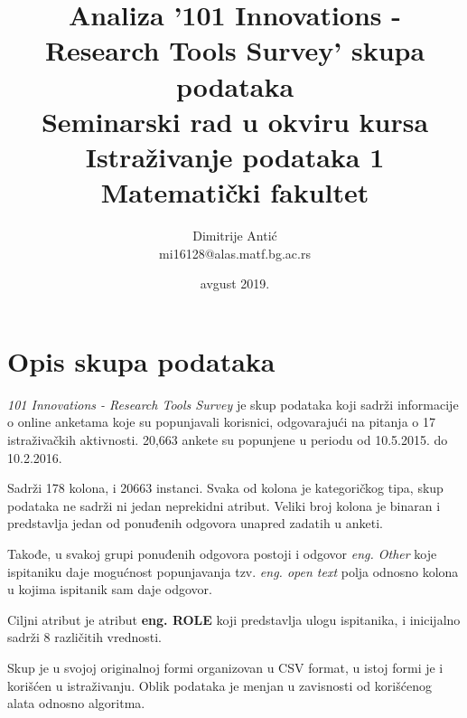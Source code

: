 \documentclass[12pt]{article}
\begin{document}
\title{Analiza '101 Innovations - Research Tools Survey' skupa podataka\\ \small{Seminarski rad u okviru kursa\\Istraživanje podataka 1\\ Matematički fakultet}}

\author{Dimitrije Antić\\ mi16128@alas.matf.bg.ac.rs}

\date{avgust 2019.}

\maketitle


\tableofcontents

\newpage

\section{Opis skupa podataka}
\label{sec:opis skupa podataka}

\textit{101 Innovations - Research Tools Survey} je skup podataka koji sadrži informacije o online anketama koje su popunjavali korisnici, odgovarajući na pitanja o 17 istraživačkih aktivnosti. 20,663 ankete su popunjene u periodu od 10.5.2015. do 10.2.2016.

Sadrži 178 kolona, i 20663 instanci. Svaka od kolona je kategoričkog tipa, skup podataka ne sadrži ni jedan neprekidni atribut. Veliki broj kolona je binaran i predstavlja jedan od ponuđenih odgovora unapred zadatih u anketi. 

Takođe, u svakoj grupi ponuđenih odgovora postoji i odgovor \textit{eng. Other} koje ispitaniku daje mogućnost popunjavanja tzv. \textit{eng. open text} polja odnosno kolona u kojima ispitanik sam daje odgovor.

Ciljni atribut je atribut \textbf{eng. ROLE} koji predstavlja ulogu ispitanika, i inicijalno sadrži 8 različitih vrednosti.

Skup je u svojoj originalnoj formi organizovan u CSV format, u istoj formi je i korišćen u istraživanju. Oblik podataka je menjan u zavisnosti od korišćenog alata odnosno algoritma.
\end{document}
